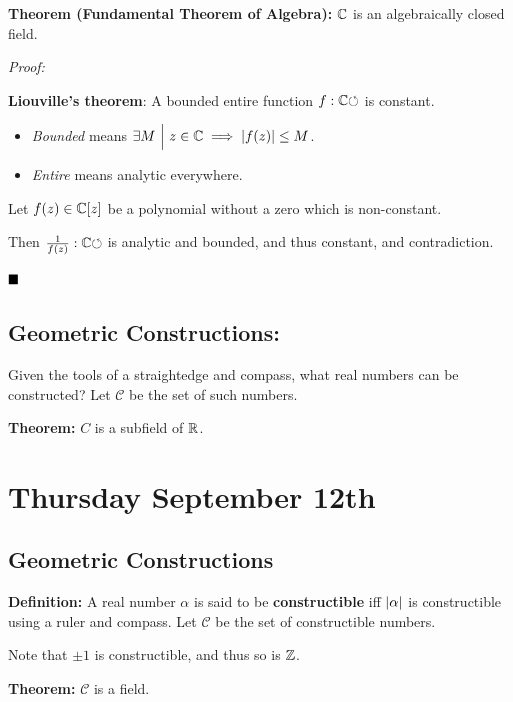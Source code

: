 \textbf{Theorem (Fundamental Theorem of Algebra):} \({\mathbb{C}}\) is an
algebraically closed field.

\emph{Proof:}

\textbf{Liouville's theorem}: A bounded entire function
\(f: {\mathbb{C}} {\circlearrowleft}\) is constant.

\begin{itemize}
\item
  \emph{Bounded} means
  \(\exists M {~\mathrel{\Big|}~} z\in {\mathbb{C}} \implies {\left\lvert {f(z)} \right\rvert} \leq M\).
\item
  \emph{Entire} means analytic everywhere.
\end{itemize}

Let \(f(z) \in {\mathbb{C}}[z]\) be a polynomial without a zero which is
non-constant.

Then \(\frac 1 {f(z)}: {\mathbb{C}} {\circlearrowleft}\) is analytic and bounded, and thus
constant, and contradiction.

\(\qed\)

\hypertarget{geometric-constructions}{%
\subsection{Geometric Constructions:}\label{geometric-constructions}}

Given the tools of a straightedge and compass, what real numbers can be
constructed? Let \(\mathcal C\) be the set of such numbers.

\textbf{Theorem:} \(C\) is a subfield of \({\mathbb{R}}\).

\hypertarget{thursday-september-12th}{%
\section{Thursday September 12th}\label{thursday-september-12th}}

\hypertarget{geometric-constructions}{%
\subsection{Geometric Constructions}\label{geometric-constructions}}

\textbf{Definition:} A real number \(\alpha\) is said to be
\textbf{constructible} iff \({\left\lvert {\alpha} \right\rvert}\) is constructible using a
ruler and compass. Let \(\mathcal C\) be the set of constructible
numbers.

Note that \(\pm 1\) is constructible, and thus so is \({\mathbb{Z}}\).

\textbf{Theorem:} \(\mathcal{C}\) is a field.

